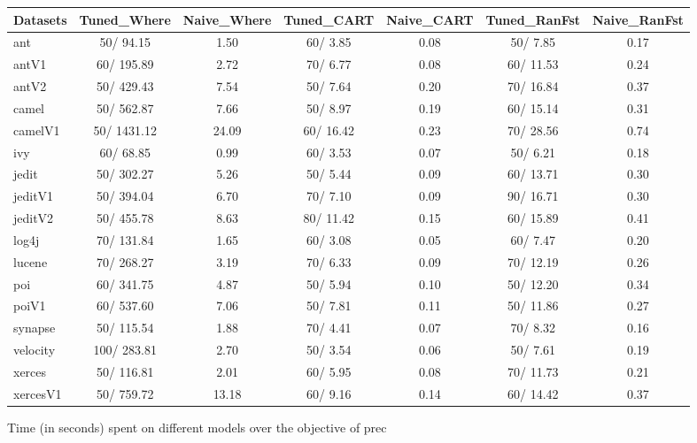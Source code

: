 \documentclass{acm_proc_article-sp}
\begin{document}
\begin{figure*}[!ht]
\scriptsize
\centering
  \begin{tabular}{l|c |c |c |c |c |c }
    \hline\hline
    Datasets & Tuned\_Where & Naive\_Where & Tuned\_CART & Naive\_CART & Tuned\_RanFst & Naive\_RanFst\\
    \hline
    ant & 50/ 94.15 & 1.50 & 60/ 3.85 & 0.08 & 50/ 7.85 & 0.17\\
    antV1 & 60/ 195.89 & 2.72 & 70/ 6.77 & 0.08 & 60/ 11.53 & 0.24\\
    antV2 & 50/ 429.43 & 7.54 & 50/ 7.64 & 0.20 & 70/ 16.84 & 0.37\\
    camel & 50/ 562.87 & 7.66 & 50/ 8.97 & 0.19 & 60/ 15.14 & 0.31\\
    camelV1 & 50/ 1431.12 & 24.09 & 60/ 16.42 & 0.23 & 70/ 28.56 & 0.74\\
    ivy & 60/ 68.85 & 0.99 & 60/ 3.53 & 0.07 & 50/ 6.21 & 0.18\\
    jedit & 50/ 302.27 & 5.26 & 50/ 5.44 & 0.09 & 60/ 13.71 & 0.30\\
    jeditV1 & 50/ 394.04 & 6.70 & 70/ 7.10 & 0.09 & 90/ 16.71 & 0.30\\
    jeditV2 & 50/ 455.78 & 8.63 & 80/ 11.42 & 0.15 & 60/ 15.89 & 0.41\\
    log4j & 70/ 131.84 & 1.65 & 60/ 3.08 & 0.05 & 60/ 7.47 & 0.20\\
    lucene & 70/ 268.27 & 3.19 & 70/ 6.33 & 0.09 & 70/ 12.19 & 0.26\\
    poi & 60/ 341.75 & 4.87 & 50/ 5.94 & 0.10 & 50/ 12.20 & 0.34\\
    poiV1 & 60/ 537.60 & 7.06 & 50/ 7.81 & 0.11 & 50/ 11.86 & 0.27\\
    synapse & 50/ 115.54 & 1.88 & 70/ 4.41 & 0.07 & 70/ 8.32 & 0.16\\
    velocity & 100/ 283.81 & 2.70 & 50/ 3.54 & 0.06 & 50/ 7.61 & 0.19\\
    xerces & 50/ 116.81 & 2.01 & 60/ 5.95 & 0.08 & 70/ 11.73 & 0.21\\
    xercesV1 & 50/ 759.72 & 13.18 & 60/ 9.16 & 0.14 & 60/ 14.42 & 0.37\\
  \end{tabular}
  \caption{Time (in seconds) spent on different models over the objective of prec}
\end{figure*}
\end{document}
